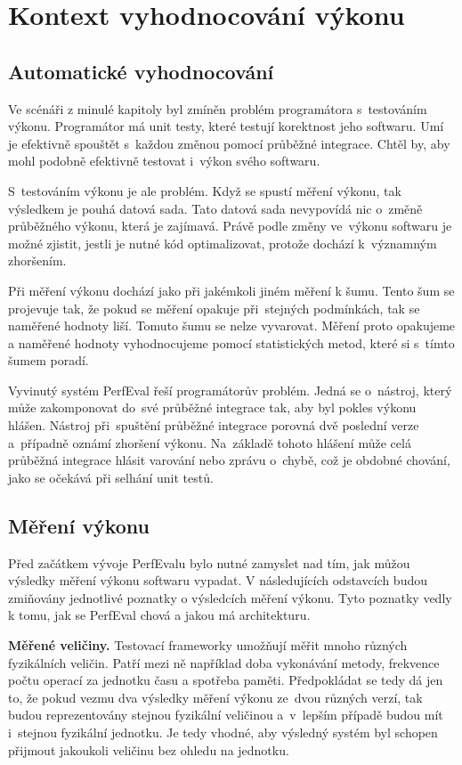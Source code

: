 \chapter{Kontext vyhodnocování výkonu}

\section{Automatické vyhodnocování}
Ve scénáři z minulé kapitoly byl zmíněn problém programátora s~testováním výkonu. Programátor má unit
testy, které testují korektnost jeho softwaru. Umí je efektivně spouštět s~každou změnou
pomocí průběžné integrace. Chtěl by, aby mohl podobně efektivně testovat i~výkon svého softwaru.

S~testováním výkonu je ale problém. Když se spustí měření výkonu, tak výsledkem je pouhá
datová sada. Tato datová sada nevypovídá nic o~změně průběžného výkonu, která
je zajímavá. Právě podle změny ve~výkonu softwaru je možné zjistit, jestli je nutné
kód optimalizovat, protože dochází k~významným zhoršením.

Při měření výkonu dochází jako při jakémkoli jiném měření k šumu. Tento šum se projevuje
tak, že pokud se měření opakuje při~stejných podmínkách, tak se naměřené hodnoty liší.
Tomuto šumu se nelze vyvarovat. Měření proto opakujeme a naměřené hodnoty vyhodnocujeme
pomocí statistických metod, které si s~tímto šumem poradí.

Vyvinutý systém PerfEval řeší programátorův problém. Jedná se o~nástroj, který může
zakomponovat do~své průběžné integrace tak, aby byl pokles výkonu hlášen. Nástroj
při~spuštění průběžné integrace porovná dvě poslední verze a~případně oznámí zhoršení výkonu.
Na~základě tohoto hlášení může celá průběžná integrace hlásit varování nebo zprávu o~chybě, což je obdobné chování,
jako se očekává při selhání unit testů.

\section{Měření výkonu}

Před začátkem vývoje PerfEvalu bylo nutné zamyslet nad tím, jak můžou výsledky měření výkonu softwaru vypadat.
V následujících odstavcích budou zmiňovány jednotlivé poznatky o výsledcích měření výkonu.
Tyto poznatky vedly k tomu, jak se PerfEval chová a jakou má architekturu.

\bigskip
\noindent\textbf{Měřené veličiny.} Testovací frameworky umožňují měřit mnoho různých fyzikálních veličin. Patří mezi ně například
doba vykonávání metody, frekvence počtu operací za jednotku času a spotřeba paměti.
Předpokládat se tedy dá jen to, že pokud vezmu dva výsledky měření výkonu ze~dvou různých
verzí, tak budou reprezentovány stejnou fyzikální veličinou a~v~lepším případě budou mít
i~stejnou fyzikální jednotku. Je tedy vhodné, aby výsledný systém byl schopen přijmout
jakoukoli veličinu bez ohledu na jednotku.

